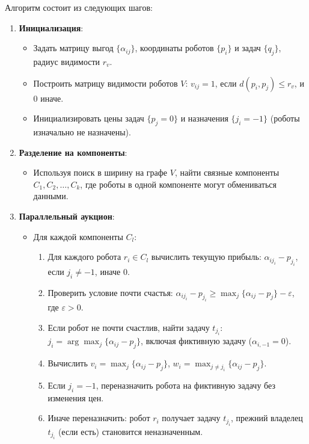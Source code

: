 Алгоритм состоит из следующих шагов:
\begin{enumerate}
    \item \textbf{Инициализация}:
    \begin{itemize}
        \item Задать матрицу выгод \( \{\alpha_{ij}\} \), координаты роботов \( \{p_i\} \) и задач \( \{q_j\} \), радиус видимости \( r_v \).
        \item Построить матрицу видимости роботов \( V \): \( v_{ij} = 1 \), если \( d(p_i, p_j) \leq r_v \), и \( 0 \) иначе.
        \item Инициализировать цены задач \( \{p_j = 0\} \) и назначения \( \{j_i = -1\} \) (роботы изначально не назначены).
    \end{itemize}
    \item \textbf{Разделение на компоненты}:
    \begin{itemize}
        \item Используя поиск в ширину на графе \( V \), найти связные компоненты \( C_1, C_2, \ldots, C_k \), где роботы в одной компоненте могут обмениваться данными.
    \end{itemize}
    \item \textbf{Параллельный аукцион}:
    \begin{itemize}
        \item Для каждой компоненты \( C_l \):
        \begin{enumerate}
            \item Для каждого робота \( r_i \in C_l \) вычислить текущую прибыль: \( \alpha_{i j_i} - p_{j_i} \), если \( j_i \neq -1 \), иначе \( 0 \).
            \item Проверить условие почти счастья: \( \alpha_{i j_i} - p_{j_i} \geq \max_j \{\alpha_{ij} - p_j\} - \varepsilon \), где \( \varepsilon > 0 \).
            \item Если робот не почти счастлив, найти задачу \( t_{j_i} \): \( j_i = \arg \max_j \{\alpha_{ij} - p_j\} \), включая фиктивную задачу (\( \alpha_{i,-1} = 0 \)).
            \item Вычислить \( v_i = \max_j \{\alpha_{ij} - p_j\} \), \( w_i = \max_{j \neq j_i} \{\alpha_{ij} - p_j\} \).
            \item Если \( j_i = -1 \), переназначить робота на фиктивную задачу без изменения цен.
            \item Иначе переназначить: робот \( r_i \) получает задачу \( t_{j_i} \), прежний владелец \( t_{j_i} \) (если есть) становится неназначенным.

\end{enumerate}
\end{itemize}
\end{enumerate}
